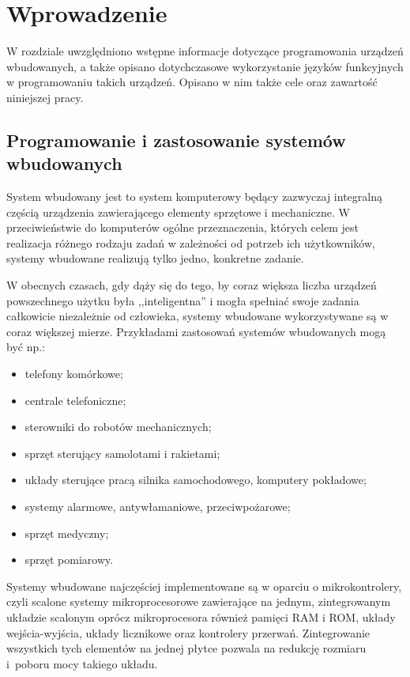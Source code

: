 \chapter{Wprowadzenie}
\label{cha:wprowadzenie}

W rozdziale uwzględniono wstępne informacje dotyczące programowania urządzeń wbudowanych, a także opisano dotychczasowe wykorzystanie języków funkcyjnych w programowaniu takich urządzeń.
Opisano w nim także cele oraz zawartość niniejszej pracy.


\section{Programowanie i zastosowanie systemów wbudowanych}
\label{sec:systemyWbudowane}

System wbudowany jest to system komputerowy będący zazwyczaj integralną częścią urządzenia zawierającego elementy sprzętowe i mechaniczne.
W przeciwieństwie do komputerów ogólne przeznaczenia, których celem jest realizacja różnego rodzaju zadań w zależności od potrzeb ich użytkowników, systemy wbudowane realizują tylko jedno, konkretne zadanie.

W obecnych czasach, gdy dąży się do tego, by coraz większa liczba urządzeń powszechnego użytku była ,,inteligentna'' i mogła spełniać swoje zadania całkowicie niezależnie od człowieka, systemy wbudowane wykorzystywane są w coraz większej mierze. Przykładami zastosowań systemów wbudowanych mogą być np.:
\begin{itemize}
\item telefony komórkowe;
\item centrale telefoniczne;
\item sterowniki do robotów mechanicznych;
\item sprzęt sterujący samolotami i rakietami;
\item układy sterujące pracą silnika samochodowego, komputery pokładowe;
\item systemy alarmowe, antywłamaniowe, przeciwpożarowe;
\item sprzęt medyczny;
\item sprzęt pomiarowy.
\end{itemize}

Systemy wbudowane najczęściej implementowane są w oparciu o mikrokontrolery, czyli scalone systemy mikroprocesorowe zawierające na jednym, zintegrowanym układzie scalonym oprócz mikroprocesora również pamięci RAM i ROM, układy wejścia-wyjścia, układy licznikowe oraz kontrolery przerwań. Zintegrowanie wszystkich tych elementów na jednej płytce pozwala na redukcję rozmiaru i~poboru mocy takiego układu.

